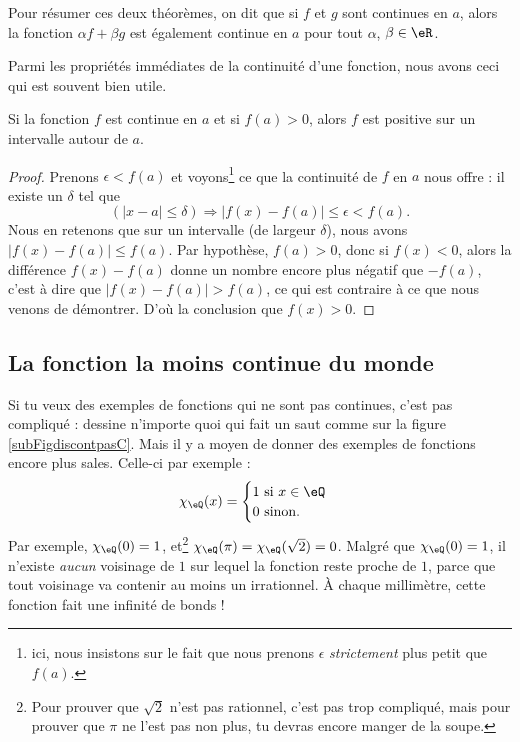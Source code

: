 Pour résumer ces deux théorèmes, on dit que si $f$ et $g$ sont continues en $a$, alors la fonction $\alpha f+\beta g$ est également continue en $a$ pour tout $\alpha$, $\beta\in\eR$.

Parmi les propriétés immédiates de la continuité d'une fonction, nous avons ceci qui est souvent bien utile.

\begin{corollary}
Si la fonction $f$ est continue en $a$ et si $f(a)>0$, alors $f$ est positive sur un intervalle autour de $a$.
\end{corollary}

\begin{proof}
Prenons $\epsilon<f(a)$ et voyons\footnote{ici, nous insistons sur le fait que nous prenons $\epsilon$ \emph{strictement} plus petit que $f(a)$.} ce que la continuité de $f$ en $a$ nous offre : il existe un $\delta$ tel que
\[ 
  (| x-a |\leq \delta)\Rightarrow | f(x)-f(a) |\leq\epsilon < f(a).
\]
Nous en retenons que sur un intervalle (de largeur $\delta$), nous avons $| f(x)-f(a) |\leq f(a)$. Par hypothèse, $f(a)>0$, donc si $f(x)<0$, alors la différence $f(x)-f(a)$ donne un nombre encore plus négatif que $-f(a)$, c'est à dire que $| f(x)-f(a) |>f(a)$, ce qui est contraire à ce que nous venons de démontrer. D'où la conclusion que $f(x)>0$.
\end{proof}


\subsection{La fonction la moins continue du monde}

Si tu veux des exemples de fonctions qui ne sont pas continues, c'est pas compliqué : dessine n'importe quoi qui fait un saut comme sur la figure \ref{subFigdiscontpasC}. Mais il y a moyen de donner des exemples de fonctions encore plus sales. Celle-ci par exemple :
\[ 
  \chi_{\eQ}(x)=
\begin{cases}
	1 \text{ si $x\in\eQ$}\\
	0 \text{ sinon.}
\end{cases}
\]
Par exemple, $\chi_{\eQ}(0)=1$, et\footnote{Pour prouver que $\sqrt{2}$ n'est pas rationnel, c'est pas trop compliqué, mais pour prouver que $\pi$ ne l'est pas non plus, tu devras encore manger de la soupe.} $\chi_{\eQ}(\pi)=\chi_{\eQ}(\sqrt{2})=0$. Malgré que $\chi_{\eQ}(0)=1$, il n'existe \emph{aucun} voisinage de $1$ sur lequel la fonction reste proche de $1$, parce que tout voisinage va contenir au moins un irrationnel. À chaque millimètre, cette fonction fait une infinité de bonds !

